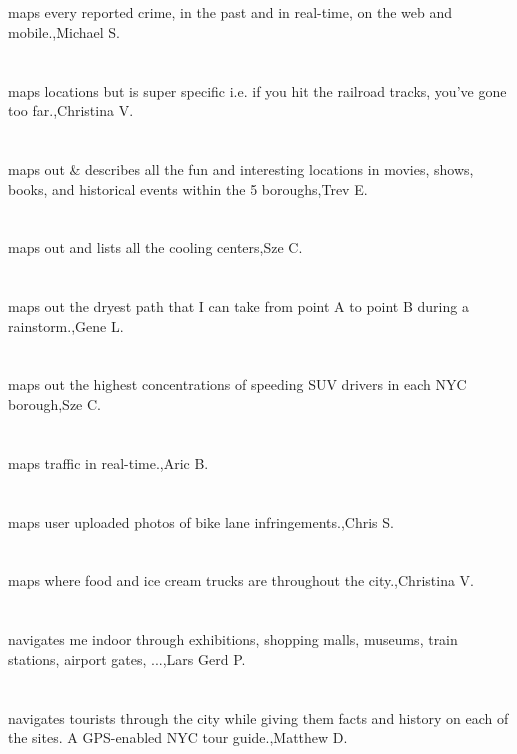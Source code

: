\section{}maps every reported crime, in the past and in real-time, on the web and mobile.,Michael S.	
\section{}maps locations but is super specific i.e. if you hit the railroad tracks, you've gone too far.,Christina  V.	
\section{}maps out \& describes all the fun and interesting locations in movies, shows, books, and historical events within the 5 boroughs,Trev E.	
\section{}maps out and lists all the cooling centers,Sze C.	
\section{}maps out the dryest path that I can take from point A to point B during a rainstorm.,Gene L.
\section{}maps out the highest concentrations of speeding SUV drivers in each NYC borough,Sze C.
\section{}maps traffic in real-time.,Aric B.
\section{}maps user uploaded photos of bike lane infringements.,Chris S.
\section{} maps where food and ice cream trucks are throughout the city.,Christina  V.
\section{}navigates me indoor through exhibitions, shopping malls, museums, train stations, airport gates, ...,Lars Gerd P.
\section{}navigates tourists through the city while giving them facts and history on each of the sites.  A GPS-enabled NYC tour guide.,Matthew D.
